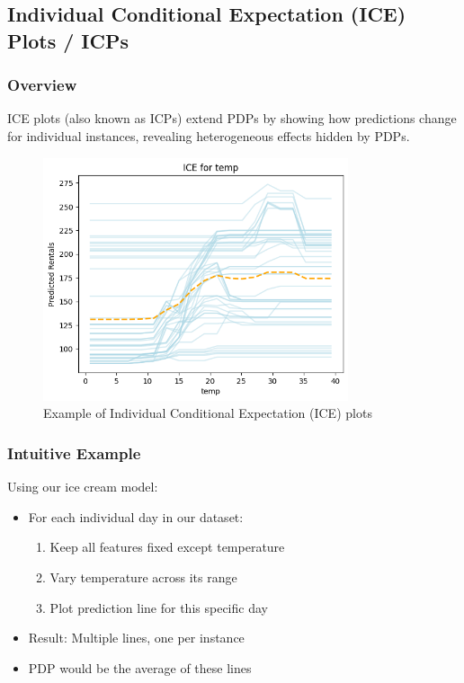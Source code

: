 \documentclass{article}
\begin{document}
\subsection{Individual Conditional Expectation (ICE) Plots / ICPs}

\subsubsection{Overview}
ICE plots (also known as ICPs) extend PDPs by showing how predictions change for individual instances, revealing heterogeneous effects hidden by PDPs.

\begin{figure}[h]
    \centering
    \includegraphics[width=0.8\textwidth]{images/ice.png}
    \caption{Example of Individual Conditional Expectation (ICE) plots}
    \label{fig:ice}
\end{figure}

\subsubsection{Intuitive Example}
Using our ice cream model:
\begin{itemize}
    \item For each individual day in our dataset:
    \begin{enumerate}
        \item Keep all features fixed except temperature
        \item Vary temperature across its range
        \item Plot prediction line for this specific day
    \end{enumerate}
    \item Result: Multiple lines, one per instance
    \item PDP would be the average of these lines
\end{itemize}
\end{document}
